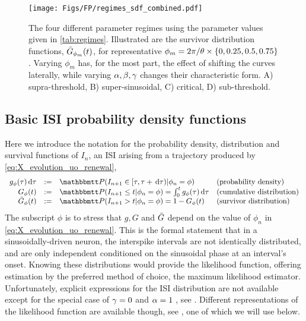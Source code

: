 \begin{figure}[ht]    
\begin{center} 
\texttt{[image: Figs/FP/regimes\_sdf\_combined.pdf]}
\caption[Model Regimes hitting-time survivor distributions]{The four different
parameter regimes using the parameter values given in \cref{tab:regimes}. Illustrated are the survivor
distribution functions, ${ \bar{G} }_{\phi_m}(t)$, for representative $\phi_m = 2\pi/{ \theta}
\times \{0,0.25,0.5,0.75\}$. Varying $\phi_m$ has, for the most part, the effect
of shifting the curves laterally, while varying ${\alpha,\beta,{\gamma } }$ changes their
characteristic form.
A) supra-threshold, B) super-sinusoidal, C) critical, D) sub-threshold.}
\label{fig:4regimes_illustrated_SDF}    
\end{center}
\end{figure}     

\clearpage

\subsection{Basic ISI probability density functions}
Here we introduce the notation for the  probability density, distribution and
survival functions of $I_n$, an ISI arising from a trajectory
produced by \cref{eq:X_evolution_uo_renewal},
\begin{equation} 
\begin{array}{rcll}
g_{\phi}(\t) \intd{\t} &:=& \Prob(I_{n+1} \in [\t, \t + \intd{\t})  | \phi_n =
\phi) &
 \textrm{(probability density)} 
\\ 
G_{\phi}(t) &:=& \Prob(I_{n+1} \leq t  |\phi_n = \phi ) = \int_0^t g_{\phi}(\t)
\intd{\t} &
 \textrm{(cumulative distribution)}
\\
\G_{\phi}(t) &:= & \Prob(I_{n+1}>t | \phi_n = \phi ) = 1 - G_{\phi}(t)
&
 \textrm{(survivor distribution)}
\end{array}
\label{eq:ISI_distribution_functions}
\end{equation}
The subscript $\phi$ is to stress that $g, G$ and ${ \bar{G} }$ depend on the value of
$\phi_n$ in \cref{eq:X_evolution_uo_renewal}. This is the formal statement that
in a sinusoidally-driven neuron, the interspike intervals are not identically
distributed, and are only independent conditioned on the sinusoidal phase at an
interval's onset. Knowing these distributions would provide the likelihood function,
offering estimation by the preferred method of choice, the maximum likelihood
estimator. Unfortunately, explicit expressions for the ISI distribution are not
available except for the special case of ${\gamma } = 0$ and $\alpha=1$ , see
\cite{DitlevsenLansky2005}. Different representations of the likelihood function
are available though, see \cite{Alili2005}, one of which we will use below.

